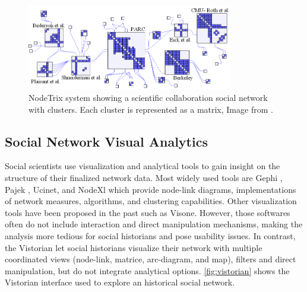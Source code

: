 \begin{figure}
    \centering %
    \includegraphics[width=0.8\textwidth]{static/figures/RelatedWork/NodeTrix.png}
    \caption{NodeTrix system showing a scientific collaboration social network with clusters. Each cluster is represented as a matrix,  Image from \cite{henryNodeTrixHybridVisualization2007}.}
    \label{fig:Riche-NodeTrix}
\end{figure}


\subsection{Social Network Visual Analytics}\label{subsec:social-network-visual-analytics}

Social scientists use visualization and analytical tools to gain insight on the structure of their finalized network data.
Most widely used tools are Gephi \cite{Gephi}, Pajek \cite{mrvarAnalysisVisualizationLarge2016}, Ucinet\cite{johnsonUCINETSoftwareTool1987}, and NodeXl \cite{NodeXL} which provide node-link diagrams, implementations of network measures, algorithms, and clustering capabilities.
Other \sna visualization tools have been proposed in the past such as Visone\cite{baurVisoneSoftwareVisual2002}.
However, those softwares often do not include interaction and direct manipulation mechanisms, making the analysis more tedious for social historians and pose usability issues.
In contrast, the Vistorian\cite{serranomolineroUnderstandingUseVistorian2017} let social historians visualize their network with multiple coordinated views (node-link, matrice, arc-diagram, and map), filters and direct manipulation, but do not integrate analytical options.
\autoref{fig:vistorian} shows the Vistorian interface used to explore an historical social network.

